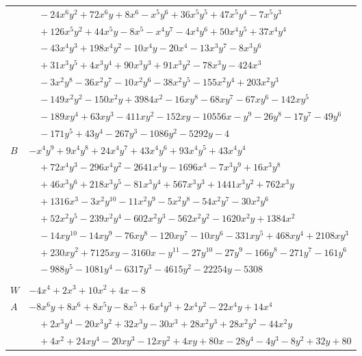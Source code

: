 \documentclass[11pt]{article}
\begin{document}
\begin{longtable}{@{}ll@{}}
 & $\quad -24x^{6}y^{2}+72x^{6}y+8x^{6}-x^{5}y^{6}+36x^{5}y^{5}+47x^{5}y^{4}-7x^{5}y^{3}$\\
 & $\quad +126x^{5}y^{2}+44x^{5}y-8x^{5}-x^{4}y^{7}-4x^{4}y^{6}+50x^{4}y^{5}+37x^{4}y^{4}$\\
 & $\quad -43x^{4}y^{3}+198x^{4}y^{2}-10x^{4}y-20x^{4}-13x^{3}y^{7}-8x^{3}y^{6}$\\
 & $\quad +31x^{3}y^{5}+4x^{3}y^{4}+90x^{3}y^{3}+91x^{3}y^{2}-78x^{3}y-424x^{3}$\\
 & $\quad -3x^{2}y^{8}-36x^{2}y^{7}-10x^{2}y^{6}-38x^{2}y^{5}-155x^{2}y^{4}+203x^{2}y^{3}$\\
 & $\quad -149x^{2}y^{2}-150x^{2}y+3984x^{2}-16xy^{8}-68xy^{7}-67xy^{6}-142xy^{5}$\\
 & $\quad -189xy^{4}+63xy^{3}-411xy^{2}-152xy-10556x-y^{9}-26y^{8}-17y^{7}-49y^{6}$\\
 & $\quad -171y^{5}+43y^{4}-267y^{3}-1086y^{2}-5292y-4$\\
$B$ & $-x^{4}y^{9}+9x^{4}y^{8}+24x^{4}y^{7}+43x^{4}y^{6}+93x^{4}y^{5}+43x^{4}y^{4}$\\
 & $\quad +72x^{4}y^{3}-296x^{4}y^{2}-2641x^{4}y-1696x^{4}-7x^{3}y^{9}+16x^{3}y^{8}$\\
 & $\quad +46x^{3}y^{6}+218x^{3}y^{5}-81x^{3}y^{4}+567x^{3}y^{3}+1441x^{3}y^{2}+762x^{3}y$\\
 & $\quad +1316x^{3}-3x^{2}y^{10}-11x^{2}y^{9}-5x^{2}y^{8}-54x^{2}y^{7}-30x^{2}y^{6}$\\
 & $\quad +52x^{2}y^{5}-239x^{2}y^{4}-602x^{2}y^{3}-562x^{2}y^{2}-1620x^{2}y+1384x^{2}$\\
 & $\quad -14xy^{10}-14xy^{9}-76xy^{8}-120xy^{7}-10xy^{6}-331xy^{5}+468xy^{4}+2108xy^{3}$\\
 & $\quad +230xy^{2}+7125xy-3160x-y^{11}-27y^{10}-27y^{9}-166y^{8}-271y^{7}-161y^{6}$\\
 & $\quad -988y^{5}-1081y^{4}-6317y^{3}-4615y^{2}-22254y-5308$\\
\addlinespace[3pt]
\multicolumn{2}{@{}l}{$g=2$, $i=7$, $m=1$, neighbours $1,4,10,11,12,25,30,32,39$}\\
$W$ & $-4x^{4}+2x^{3}+10x^{2}+4x-8$\\
$A$ & $-8x^{6}y+8x^{6}+8x^{5}y-8x^{5}+6x^{4}y^{3}+2x^{4}y^{2}-22x^{4}y+14x^{4}$\\
 & $\quad +2x^{3}y^{4}-20x^{3}y^{2}+32x^{3}y-30x^{3}+28x^{2}y^{3}+28x^{2}y^{2}-44x^{2}y$\\
 & $\quad +4x^{2}+24xy^{4}-20xy^{3}-12xy^{2}+4xy+80x-28y^{4}-4y^{3}-8y^{2}+32y+80$\\

\end{longtable}
\end{document}
